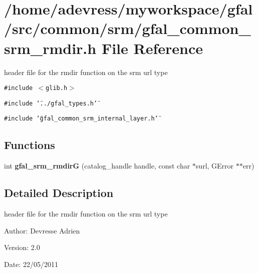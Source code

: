 \section{/home/adevress/myworkspace/gfal/src/common/srm/gfal\_\-common\_\-srm\_\-rmdir.h File Reference}
\label{gfal__common__srm__rmdir_8h}
header file for the rmdir function on the srm url type 

{\tt \#include $<$glib.h$>$}\par
{\tt \#include \char`\"{}../gfal\_\-types.h\char`\"{}}\par
{\tt \#include \char`\"{}gfal\_\-common\_\-srm\_\-internal\_\-layer.h\char`\"{}}\par
\subsection*{Functions}
\begin{CompactItemize}
\item 
int \textbf{gfal\_\-srm\_\-rmdir\-G} (catalog\_\-handle handle, const char $\ast$surl, GError $\ast$$\ast$err)\label{gfal__common__srm__rmdir_8h_8b7d02475abc3094e00223e0fa5ec35d}

\end{CompactItemize}


\subsection{Detailed Description}
header file for the rmdir function on the srm url type 

\begin{Desc}
\item[Author:]Devresse Adrien \end{Desc}
\begin{Desc}
\item[Version:]2.0 \end{Desc}
\begin{Desc}
\item[Date:]22/05/2011 \end{Desc}

